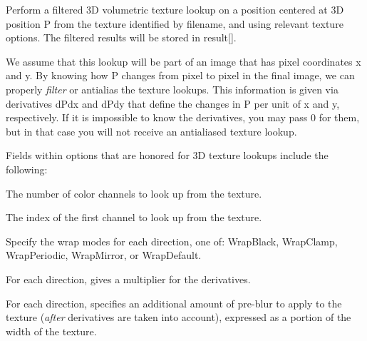 
Perform a filtered 3D volumetric texture lookup on a position centered at
3D position {\cf P} from the texture identified by
{\cf filename}, and using relevant texture {\cf options}.  The filtered
results will be stored in {\cf result[]}.

We assume that this lookup will be part of an image that has pixel
coordinates {\cf x} and {\cf y}.  By knowing how {\cf P} changes from
pixel to pixel in the final image, we can properly \emph{filter} or
antialias the texture lookups.  This information is given via
derivatives {\cf dPdx} and {\cf dPdy} that define the changes in {\cf P}
per unit of {\cf x} and {\cf y}, respectively.  If it is impossible to
know the derivatives, you may pass 0 for them, but in that case you will
not receive an antialiased texture lookup.

Fields within {\cf options} that are honored for 3D texture lookups
include the following:

\vspace{-12pt}
\vspace{10pt}
The number of color channels to look up from the texture.
\apiend

\vspace{-24pt}
\vspace{10pt}
The index of the first channel to look up from the texture.
\apiend

\vspace{-24pt}
\vspace{10pt}
Specify the wrap modes for each direction, one of: 
{\cf WrapBlack}, {\cf WrapClamp}, {\cf WrapPeriodic}, {\cf WrapMirror},
or {\cf WrapDefault}.
\apiend

\vspace{-24pt}
\vspace{10pt}
For each direction, gives a multiplier for the derivatives.
\apiend

\vspace{-24pt}
\vspace{10pt}
For each direction, specifies an additional amount of pre-blur to apply
to the texture (\emph{after} derivatives are taken into account),
expressed as a portion of the width of the texture.
\apiend

